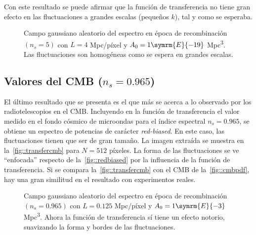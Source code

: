 Con este resultado se puede afirmar que la función de transferencia no tiene gran efecto en las fluctuaciones a grandes escalas (pequeños \(k\)), tal y como se esperaba.
\begin{figure}
    \centering
    \def\svgwidth{.94\textwidth}
    
    \caption[Espectro en época de recombinación \(N=256\) píxeles]{Campo gaussiano aleatorio del espectro en época de recombinación \((n_s=5)\) con \(L=4\) Mpc/píxel y \(A_0=1\symrm{E}{-19}\) Mpc\textsuperscript{3}. Las fluctuaciones son homogéneas como se espera en grandes escalas.}
    \label{fig::transfergrandes}
\end{figure}
\clearpage
\subsection{Valores del CMB (\texorpdfstring{\(n_s=0.965\)}{ns=0.965})}
El último resultado que se presenta es el que más se acerca a lo observado por los radiotelescopios en el CMB. Incluyendo en la función de transferencia el valor medido en el fondo cósmico de microondas para el índice espectral \(n_s=0.965\), se obtiene un espectro de potencias de carácter \textit{red-biased}. En este caso, las fluctuaciones tienen que ser de gran tamaño. La imagen extraída se muestra en la~\autoref{fig::transfercmb} para \(N=512\) píxeles. La forma de las fluctuaciones se ve ``enfocada'' respecto de la~\autoref{fig::redbiased} por la influencia de la función de transferencia. Si se compara la~\autoref{fig::transfercmb} con el CMB de la~\autoref{fig::cmbpdf}, hay una gran similitud en el resultado con experimentos reales.
\begin{figure}[h!]
    \centering
    {}
    \caption[Valores del CMB \(N=512\) píxeles]{Campo gaussiano aleatorio del espectro en época de recombinación \((n_s=0.965)\) con \(L=0.125\) Mpc/píxel y \(A_0=1\symrm{E}{-3}\) Mpc\textsuperscript{3}. Ahora la función de transferencia sí tiene un efecto notorio, suavizando la forma y bordes de las fluctuaciones.}
    \label{fig::transfercmb}
\end{figure}

